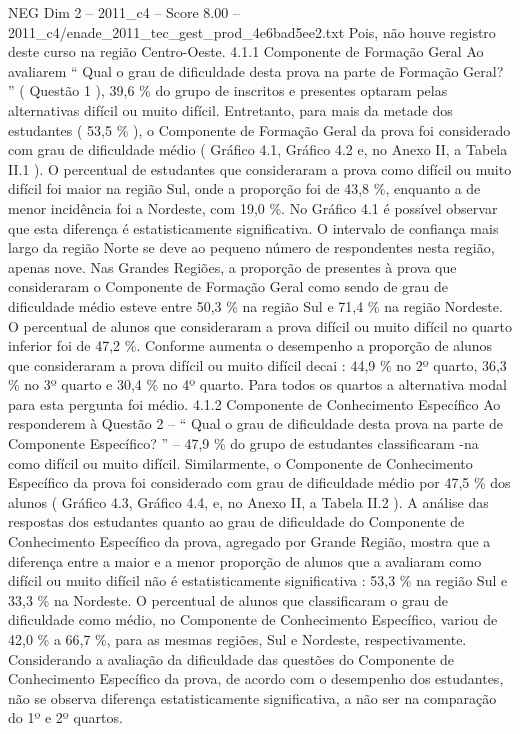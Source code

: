 \begin{textsample}{NEG Dim 2 – 2011\_c4 – Score 8.00 – 2011\_c4/enade\_2011\_tec\_gest\_prod\_4e6bad5ee2.txt}
Pois, não houve registro deste curso na região Centro-Oeste. 4.1.1 Componente de Formação Geral Ao avaliarem “ Qual o grau de dificuldade desta prova na parte de Formação Geral? ” ( Questão 1 ), 39,6 \% do grupo de inscritos e presentes optaram pelas alternativas difícil ou muito difícil.
Entretanto, para mais da metade dos estudantes ( 53,5 \% ), o Componente de Formação Geral da prova foi considerado com grau de dificuldade médio ( Gráfico 4.1, Gráfico 4.2 e, no Anexo II, a Tabela II.1 ).
O percentual de estudantes que consideraram a prova como difícil ou muito difícil foi maior na região Sul, onde a proporção foi de 43,8 \%, enquanto a de menor incidência foi a Nordeste, com 19,0 \%.
No Gráfico 4.1 é possível observar que esta diferença é estatisticamente significativa.
O intervalo de confiança mais largo da região Norte se deve ao pequeno número de respondentes nesta região, apenas nove.
Nas Grandes Regiões, a proporção de presentes à prova que consideraram o Componente de Formação Geral como sendo de grau de dificuldade médio esteve entre 50,3 \% na região Sul e 71,4 \% na região Nordeste.
O percentual de alunos que consideraram a prova difícil ou muito difícil no quarto inferior foi de 47,2 \%.
Conforme aumenta o desempenho a proporção de alunos que consideraram a prova difícil ou muito difícil decai : 44,9 \% no 2º quarto, 36,3 \% no 3º quarto e 30,4 \% no 4º quarto.
Para todos os quartos a alternativa modal para esta pergunta foi médio. 4.1.2 Componente de Conhecimento Específico Ao responderem à Questão 2 – “ Qual o grau de dificuldade desta prova na parte de Componente Específico? ” – 47,9 \% do grupo de estudantes classificaram -na como difícil ou muito difícil.
Similarmente, o Componente de Conhecimento Específico da prova foi considerado com grau de dificuldade médio por 47,5 \% dos alunos ( Gráfico 4.3, Gráfico 4.4, e, no Anexo II, a Tabela II.2 ).
A análise das respostas dos estudantes quanto ao grau de dificuldade do Componente de Conhecimento Específico da prova, agregado por Grande Região, mostra que a diferença entre a maior e a menor proporção de alunos que a avaliaram como difícil ou muito difícil não é estatisticamente significativa : 53,3 \% na região Sul e 33,3 \% na Nordeste.
O percentual de alunos que classificaram o grau de dificuldade como médio, no Componente de Conhecimento Específico, variou de 42,0 \% a 66,7 \%, para as mesmas regiões, Sul e Nordeste, respectivamente.
Considerando a avaliação da dificuldade das questões do Componente de Conhecimento Específico da prova, de acordo com o desempenho dos estudantes, não se observa diferença estatisticamente significativa, a não ser na comparação do 1º e 2º quartos.

\end{textsample}
